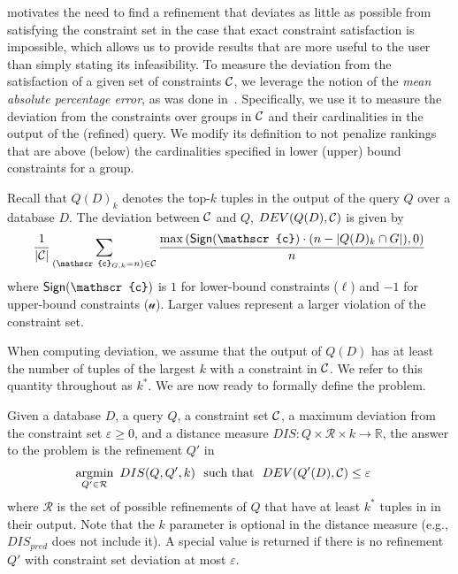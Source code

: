  motivates the need to find a refinement that deviates as little as possible from satisfying the constraint set in the case that exact constraint satisfaction is impossible, which allows us to provide results that are more useful to the user than simply stating its infeasibility.
To measure the deviation from the satisfaction of a given set of constraints $\mathcal{C}$, we leverage the notion of the \emph{mean absolute percentage error}, as was done in~\cite{BAM14}. Specifically, we use it to measure the deviation from the constraints over groups in $\mathcal{C}$ and their cardinalities in the output of the (refined) query. We modify its definition to not penalize rankings that are above (below) the cardinalities specified in lower (upper) bound constraints for a group. 
\begin{definition}[Deviation]%
\label{def:mospe}
Recall that $Q(D)_k$ denotes the top-$k$ tuples in the output of the query $Q$ over a database $D$.  The deviation between $\mathcal{C}$ and $Q$, $DEV(Q(D), \mathcal{C})$ is given by
\begin{align*}
 \frac{1}{|\constraints|} \sum_{(\mathscr{c}_{G, k} = n) \in \constraints} \frac{\max \left(\sign(\mathscr{c}) \cdot (n - |Q(D)_k \cap G|), 0 \right)}{n} 
\end{align*}
where $\sign(\mathscr{c})$ is $1$ for lower-bound constraints ($\ell$) and $-1$ for upper-bound constraints ($\mathscr{u}$). Larger values represent a larger violation of the constraint set.
\end{definition}

When computing deviation, we assume that the output of $Q(D)$ has at least the number of tuples of the largest $k$ with a constraint in $\mathcal{C}$. We refer to this quantity throughout as $k^*$.
We are now ready to formally define the \problem{} problem.

\begin{definition}[\problem{}]
\label{def:best-approx-refinement}
    Given a database $D$, a query $Q$, a constraint set $\mathcal{C}$, a maximum deviation from the constraint set $\varepsilon \geq 0$, and a distance measure $DIS : Q \times \mathcal{R} \times k \rightarrow \mathbb{R}$, the answer to the \problem{} problem is the refinement $Q'$ in
    \begin{align*}
        \operatorname*{argmin}_{Q' \in \mathcal{R}}\ DIS(Q, Q', k) \ \ \textrm{such that} \ \ & DEV(Q'(D), \mathcal{C}) \leq \varepsilon
    \end{align*}
    where $\mathcal{R}$ is the set of possible refinements of $Q$ that have at least $k^*$ tuples in in their output. %
    Note that the $k$ parameter is optional in the distance measure (e.g., $DIS_{pred}$ does not include it). %
    A special value is returned if there is no refinement $Q'$ with constraint set deviation at most $\varepsilon$. %
\end{definition}


